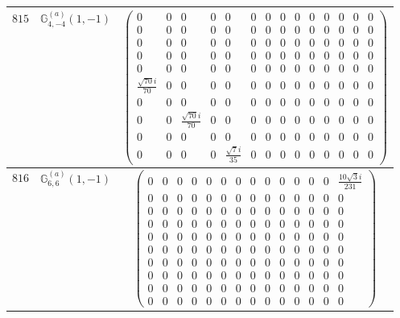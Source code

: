 \documentclass[fleqn,8pt,landscape]{jsarticle}
\begin{document}
\begin{center}
\begin{longtable}{ccc}
$ 815 $ & $ \mathbb{G}_{4,-4}^{(a)}(1,-1) $ & $ \begin{pmatrix} 0 & 0 & 0 & 0 & 0 & 0 & 0 & 0 & 0 & 0 & 0 & 0 & 0 & 0 \\ 0 & 0 & 0 & 0 & 0 & 0 & 0 & 0 & 0 & 0 & 0 & 0 & 0 & 0 \\ 0 & 0 & 0 & 0 & 0 & 0 & 0 & 0 & 0 & 0 & 0 & 0 & 0 & 0 \\ 0 & 0 & 0 & 0 & 0 & 0 & 0 & 0 & 0 & 0 & 0 & 0 & 0 & 0 \\ 0 & 0 & 0 & 0 & 0 & 0 & 0 & 0 & 0 & 0 & 0 & 0 & 0 & 0 \\ \frac{\sqrt{70} i}{70} & 0 & 0 & 0 & 0 & 0 & 0 & 0 & 0 & 0 & 0 & 0 & 0 & 0 \\ 0 & 0 & 0 & 0 & 0 & 0 & 0 & 0 & 0 & 0 & 0 & 0 & 0 & 0 \\ 0 & 0 & \frac{\sqrt{70} i}{70} & 0 & 0 & 0 & 0 & 0 & 0 & 0 & 0 & 0 & 0 & 0 \\ 0 & 0 & 0 & 0 & 0 & 0 & 0 & 0 & 0 & 0 & 0 & 0 & 0 & 0 \\ 0 & 0 & 0 & 0 & \frac{\sqrt{7} i}{35} & 0 & 0 & 0 & 0 & 0 & 0 & 0 & 0 & 0 \end{pmatrix} $ \\ \hline
$ 816 $ & $ \mathbb{G}_{6,6}^{(a)}(1,-1) $ & $ \begin{pmatrix} 0 & 0 & 0 & 0 & 0 & 0 & 0 & 0 & 0 & 0 & 0 & 0 & 0 & \frac{10 \sqrt{3} i}{231} \\ 0 & 0 & 0 & 0 & 0 & 0 & 0 & 0 & 0 & 0 & 0 & 0 & 0 & 0 \\ 0 & 0 & 0 & 0 & 0 & 0 & 0 & 0 & 0 & 0 & 0 & 0 & 0 & 0 \\ 0 & 0 & 0 & 0 & 0 & 0 & 0 & 0 & 0 & 0 & 0 & 0 & 0 & 0 \\ 0 & 0 & 0 & 0 & 0 & 0 & 0 & 0 & 0 & 0 & 0 & 0 & 0 & 0 \\ 0 & 0 & 0 & 0 & 0 & 0 & 0 & 0 & 0 & 0 & 0 & 0 & 0 & 0 \\ 0 & 0 & 0 & 0 & 0 & 0 & 0 & 0 & 0 & 0 & 0 & 0 & 0 & 0 \\ 0 & 0 & 0 & 0 & 0 & 0 & 0 & 0 & 0 & 0 & 0 & 0 & 0 & 0 \\ 0 & 0 & 0 & 0 & 0 & 0 & 0 & 0 & 0 & 0 & 0 & 0 & 0 & 0 \\ 0 & 0 & 0 & 0 & 0 & 0 & 0 & 0 & 0 & 0 & 0 & 0 & 0 & 0 \end{pmatrix} $ \\ \hline

\end{longtable}
\end{center}
\end{document}
